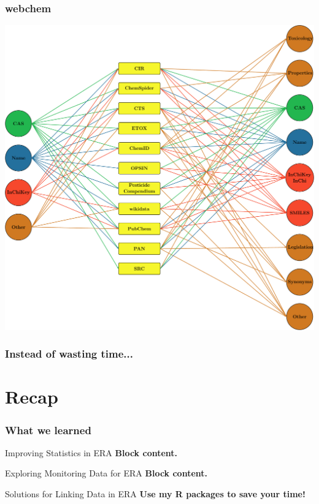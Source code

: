 \documentclass[10pt
]{beamer}
\begin{document}
\begin{frame}
\frametitle{webchem}
	\begin{center}
	\includegraphics[width =.7\textwidth]{figs/sources_webchem.pdf} \\
	\end{center}

\end{frame}


\begin{frame}
\frametitle{Instead of wasting time...}

\end{frame}


\section*{Recap}

\begin{frame}
\frametitle{What we learned}
	\begin{exampleblock}{Improving Statistics in ERA}
		\textbf{Block content.}
	\end{exampleblock}

	\begin{exampleblock}{Exploring Monitoring Data for ERA}
		\textbf{Block content.}
	\end{exampleblock}

	\begin{exampleblock}{Solutions for Linking Data in ERA}
		\textbf{Use my R packages to save your time!}
	\end{exampleblock}


\end{frame}
\end{document}
